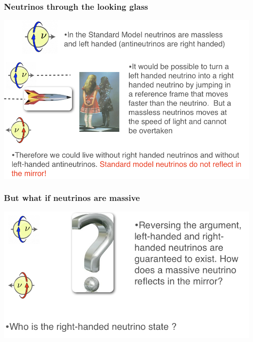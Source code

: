 \begin{frame}
\frametitle{Neutrinos through the looking glass}
\includegraphics[scale=0.33]{img/NeutrinosLookingG.png}
\end{frame}

\begin{frame}
\frametitle{But what if neutrinos are massive}
\includegraphics[scale=0.33]{img/WhatIfNeutrinoMassive.png}

\end{frame}




